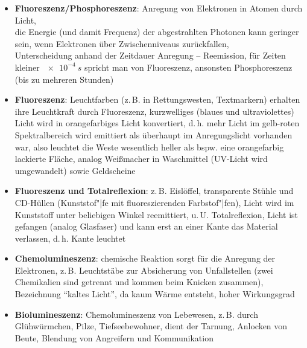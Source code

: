 \begin{itemize}
    \item
    \textbf{Fluoreszenz/Phosphoreszenz}:
    Anregung von Elektronen in Atomen durch Licht, \\
    die Energie (und damit Frequenz) der abgestrahlten Photonen
    kann geringer sein,
    wenn Elektronen über Zwischenniveaus zurückfallen, \\
    Unterscheidung anhand der Zeitdauer Anregung -- Reemission,
    für Zeiten kleiner $\SI{e-4}{s}$ spricht man von
    Fluoreszenz, ansonsten Phosphoreszenz (bis zu mehreren Stunden)

    \item
    \textbf{Fluoreszenz}:
    Leuchtfarben (z.\,B. in Rettungswesten, Textmarkern) erhalten ihre
    Leuchtkraft durch Fluoreszenz,
    kurzwelliges (blaues und ultraviolettes) Licht wird in orangefarbiges
    Licht konvertiert, d.\,h. mehr Licht im gelb-roten Spektralbereich wird
    emittiert als überhaupt im Anregungslicht vorhanden war, also leuchtet
    die Weste wesentlich heller als bspw. eine orangefarbig lackierte Fläche,
    analog Weißmacher in Waschmittel (UV-Licht wird umgewandelt)
    sowie Geldscheine

    \item
    \textbf{Fluoreszenz und Totalreflexion}:
    z.\,B. Eislöffel, transparente Stühle und CD-Hüllen
    (Kunststof"|fe mit fluoreszierenden Farbstof"|fen),
    Licht wird im Kunststoff unter beliebigen Winkel reemittiert,
    u.\,U. Totalreflexion, Licht ist gefangen (analog Glasfaser) und
    kann erst an einer Kante das Material verlassen, d.\,h. Kante leuchtet
\end{itemize}
\linie
\begin{itemize}
    \item
    \textbf{Chemolumineszenz}:
    chemische Reaktion sorgt für die Anregung der Elektronen, z.\,B.
    Leuchtstäbe zur Absicherung von Unfallstellen
    (zwei Chemikalien sind getrennt und kommen beim Knicken zusammen),
    Bezeichnung "`kaltes Licht"', da kaum Wärme entsteht, hoher Wirkungsgrad

    \item
    \textbf{Biolumineszenz}:
    Chemolumineszenz von Lebewesen, z.\,B. durch Glühwürmchen, Pilze,
    Tiefseebewohner, dient der Tarnung, Anlocken von Beute,
    Blendung von Angreifern und Kommunikation
\end{itemize}
\linie

